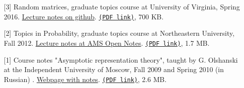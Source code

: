\begin{enumerate}
\item[{[3]}]
Random matrices, graduate topics course at University of Virginia, Spring 2016. \href{https://github.com/lenis2000/RMT_Spring_2016/blob/master/Random_Matrices_Notes.pdf}{Lecture notes on github}. \href{https://storage.lpetrov.cc/papers/lec03-Random_Matrices_Notes.pdf}{\texttt{(PDF link)}}, 700 KB.





















































\item[{[2]}]
Topics in Probability, graduate topics course at Northeastern University, Fall 2012. \href{https://www.ams.org/open-math-notes/omn-view-listing?listingId=110813}{Lecture notes at AMS Open Notes}. \href{https://storage.lpetrov.cc/papers/lec02-OMN-202001-110813-1-Course_notes-v1.pdf}{\texttt{(PDF link)}}, 1.7 MB.















\item[{[1]}]
Course notes "Asymptotic representation theory", taught by G. Olshanski at the Independent University of Moscow, Fall 2009 and Spring 2010 (in Russian)
. \href{https://lpetrov.cc/art/}{Webpage with notes}. \href{https://storage.lpetrov.cc/papers/lec01-Olshanski_ART_course.pdf}{\texttt{(PDF link)}}, 2.6 MB.




























\end{enumerate}

